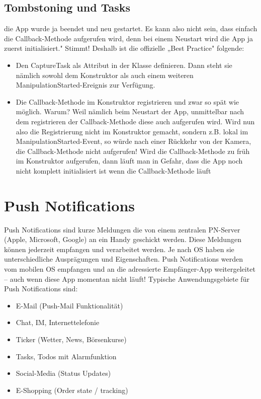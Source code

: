 \documentclass[a4paper,10pt]{scrreprt}
\begin{document}
\section{Tombstoning und Tasks}
die App wurde ja beendet und neu gestartet. Es kann also nicht sein, dass
einfach die Callback-Methode aufgerufen wird, denn bei einem Neustart wird die App ja zuerst initialisiert."
Stimmt! Deshalb ist die offizielle „Best Practice" folgende:
\begin{itemize}

\item Den CaptureTask als Attribut in der Klasse definieren. Dann steht sie nämlich sowohl dem Konstruktor
als auch einem weiteren ManipulationStarted-Ereignis zur Verfügung.
\item Die Callback-Methode im Konstruktor registrieren und zwar so spät wie möglich. Warum? Weil nämlich
beim Neustart der App, unmittelbar nach dem registrieren der Callback-Methode diese auch aufgerufen
wird. Wird nun also die Registrierung nicht im Konstruktor gemacht, sondern z.B. lokal im
ManipulationStarted-Event, so würde nach einer Rückkehr von der Kamera, die Callback-Methode nicht
aufgerufen!
Wird die Callback-Methode zu früh im Konstruktor aufgerufen, dann läuft man in Gefahr, dass die App
noch nicht komplett initialisiert ist wenn die Callback-Methode läuft

\end{itemize}

\chapter{Push Notifications}
Push Notifications sind kurze Meldungen die von einem zentralen PN-Server (Apple, Microsoft, Google) an ein
Handy geschickt werden. Diese Meldungen können jederzeit empfangen und verarbeitet werden. Je nach OS
haben sie unterschiedliche Ausprägungen und Eigenschaften. Push Notifications werden vom mobilen OS
empfangen und an die adressierte Empfänger-App weitergeleitet – auch wenn diese App momentan nicht läuft!
Typische Anwendungsgebiete für Push Notifications sind:
\begin{itemize}
 \item E-Mail (Push-Mail Funktionalität)
\item Chat, IM, Internettelefonie
\item Ticker (Wetter, News, Börsenkurse)
\item Tasks, Todos mit Alarmfunktion
\item Social-Media (Status Updates)
\item E-Shopping (Order state / tracking)
\end{itemize}
\end{document}
